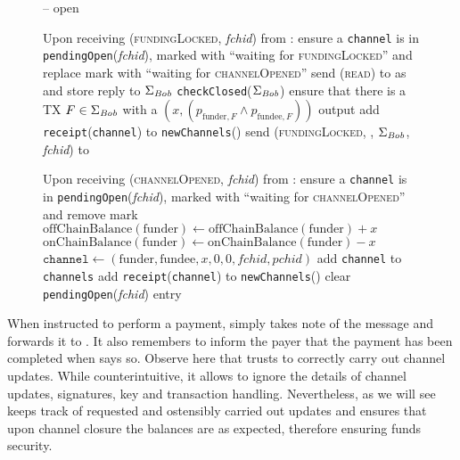 \begin{figure}[H]
\begin{systembox}{\fpaynet{} -- open}
\begin{algorithmic}[1]
        \State Upon receiving (\textsc{fundingLocked}, \textit{fchid}) from
        \simulator:
        \Indent
          \State ensure a \texttt{channel} is in
          \texttt{pendingOpen}(\textit{fchid}), marked with ``waiting for
          \textsc{fundingLocked}'' and replace mark with ``waiting for
          \textsc{channelOpened}''
          \State send (\textsc{read}) to \ledger{} as \bob{} and store reply
          to $\Sigma_{\mathit{Bob}}$
          \State \texttt{checkClosed}($\Sigma_{\mathit{Bob}}$)
          \label{alg:fpaynet:checkForNew:read:bob}
          \State ensure that there is a TX $F \in \Sigma_{\mathit{Bob}}$ with a
          $\left(x, \left(p_{\mathrm{funder}, F} \wedge p_{\mathrm{fundee},
          F}\right)\right)$ output
          \State add \texttt{receipt}(\texttt{channel}) to
          \texttt{newChannels}(\bob)
          \label{alg:fpaynet:fundingLocked:report}
          \State send (\textsc{fundingLocked}, \bob, $\Sigma_{\mathit{Bob}}$,
          \textit{fchid}) to \simulator
          \label{alg:fpaynet:fundingLocked:sim}
        \EndIndent
        \Statex

        \State Upon receiving (\textsc{channelOpened}, \textit{fchid}) from
        \simulator:
        \Indent
          \State ensure a \texttt{channel} is in
          \texttt{pendingOpen}(\textit{fchid}), marked with ``waiting for
          \textsc{channelOpened}'' and remove mark
          \State $\mathrm{offChainBalance}\left(\mathrm{funder}\right) \gets
          \mathrm{offChainBalance}\left(\mathrm{funder}\right) + x$
          \label{alg:fpaynet:channelOpened:offchain}
          \State $\mathrm{onChainBalance}\left(\mathrm{funder}\right) \gets
          \mathrm{onChainBalance}\left(\mathrm{funder}\right) - x$
          \label{alg:fpaynet:channelOpened:onchain}
          \State $\mathtt{channel} \gets \left(\mathrm{funder}, \mathrm{fundee},
          x, 0, 0, \mathit{fchid}, \mathit{pchid}\right)$
          \State add \texttt{channel} to \texttt{channels}
          \State add \texttt{receipt}(\texttt{channel}) to
          \texttt{newChannels}(\alice)
          \label{alg:fpaynet:channelOpened:report}
          \State clear \texttt{pendingOpen}(\textit{fchid}) entry
        \EndIndent
      \end{algorithmic}
    \end{systembox}
    \caption{}
    \label{alg:fpaynet:open}
  \end{figure}

  When instructed to perform a payment, \fpaynet{} simply takes note of the
  message and forwards it to \simulator. It also remembers to inform the payer
  that the payment has been completed when \simulator{} says so. Observe here
  that \fpaynet{} trusts \simulator{} to correctly carry out channel updates.
  While counterintuitive, it allows \fpaynet{} to ignore the details of channel
  updates, signatures, key and transaction handling. Nevertheless, as we will
  see \fpaynet{} keeps track of requested and ostensibly carried out updates and
  ensures that upon channel closure the balances are as expected, therefore
  ensuring funds security.

